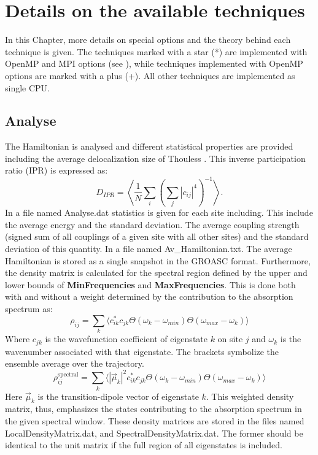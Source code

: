 \chapter{\label{chap:techniques}Details on the available techniques}
In this Chapter, more details on special options and the theory behind each technique is given. The techniques marked with a star (*) are implemented with OpenMP and MPI options (see \cite{Sardjan_2020}), while techniques implemented with OpenMP options are marked with a plus (+). All other techniques are implemented as single CPU. 
\section{Analyse}
The Hamiltonian is analysed and different statistical properties are provided including the average delocalization size of Thouless \cite{Thouless.1974.PR.13.93}. This inverse participation ratio (IPR) is expressed as:
\begin{equation}
	D_{IPR}=\left\langle\frac{1}{N}\sum_i\left(\sum_j |c_{ij}|^{4}\right)^{-1}\right \rangle.
\end{equation}
In a file named Analyse.dat statistics is given for each site including. This include the average energy and the standard deviation. The average coupling strength (signed sum of all couplings of a given site with all other sites) and the standard deviation of this quantity.
In a file named Av\_Hamiltonian.txt. The average Hamiltonian is stored as a single snapshot in the GROASC format.
Furthermore, the density matrix is calculated for the spectral region defined by the upper and lower bounds of \textbf{MinFrequencies} and \textbf{MaxFrequencies}. This is done both with and without a weight determined by the contribution to the absorption spectrum as:
\begin{equation}
\rho_{ij}=\sum_k \Big\langle c_{ik}^* c_{jk}  \Theta(\omega_{k}-\omega_{min})\Theta(\omega_{max}-\omega_k)\Big\rangle
\end{equation}
Where $c_{jk}$ is the wavefunction coefficient of eigenstate $k$ on site $j$ and $\omega_k$ is the wavenumber associated with that eigenstate. The brackets symbolize the ensemble average over the trajectory.
\begin{equation}
\rho^{\textrm{spectral}}_{ij}=\sum_k \Big\langle |\vec{\mu}_k|^2 c_{ik}^* c_{jk}  \Theta(\omega_{k}-\omega_{min})\Theta(\omega_{max}-\omega_k)\Big\rangle
\end{equation}
Here $\vec{\mu}_k$ is the transition-dipole vector of eigenstate $k$. This weighted density matrix, thus, emphasizes the states contributing to the absorption spectrum in the given spectral window. These density matrices are stored in the files named LocalDensityMatrix.dat, and SpectralDensityMatrix.dat. The former should be identical to the unit matrix if the full region of all eigenstates is included.

